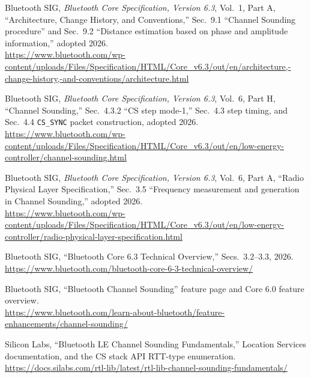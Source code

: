 \documentclass[11pt,a4paper]{article}
\newcommand{\code}[1]{\texttt{\small #1}}
\begin{document}
\begin{enumerate}[label={[\arabic*]},leftmargin=2.2em,itemsep=3pt]
\item Bluetooth SIG, \emph{Bluetooth Core Specification, Version 6.3}, Vol.\ 1, Part A,
  ``Architecture, Change History, and Conventions,'' Sec.\ 9.1 ``Channel Sounding procedure'' and
  Sec.\ 9.2 ``Distance estimation based on phase and amplitude information,'' adopted 2026.\\
  {\small\url{https://www.bluetooth.com/wp-content/uploads/Files/Specification/HTML/Core_v6.3/out/en/architecture,-change-history,-and-conventions/architecture.html}}

\item Bluetooth SIG, \emph{Bluetooth Core Specification, Version 6.3}, Vol.\ 6, Part H,
  ``Channel Sounding,'' Sec.\ 4.3.2 ``CS step mode-1,'' Sec.\ 4.3 step timing, and Sec.\ 4.4
  \code{CS\_SYNC} packet construction, adopted 2026.\\
  {\small\url{https://www.bluetooth.com/wp-content/uploads/Files/Specification/HTML/Core_v6.3/out/en/low-energy-controller/channel-sounding.html}}

\item Bluetooth SIG, \emph{Bluetooth Core Specification, Version 6.3}, Vol.\ 6, Part A,
  ``Radio Physical Layer Specification,'' Sec.\ 3.5 ``Frequency measurement and generation in
  Channel Sounding,'' adopted 2026.\\
  {\small\url{https://www.bluetooth.com/wp-content/uploads/Files/Specification/HTML/Core_v6.3/out/en/low-energy-controller/radio-physical-layer-specification.html}}

\item Bluetooth SIG, ``Bluetooth Core 6.3 Technical Overview,'' Secs.\ 3.2--3.3, 2026.\\
  {\small\url{https://www.bluetooth.com/bluetooth-core-6-3-technical-overview/}}

\item Bluetooth SIG, ``Bluetooth Channel Sounding'' feature page and Core 6.0 feature overview.\\
  {\small\url{https://www.bluetooth.com/learn-about-bluetooth/feature-enhancements/channel-sounding/}}

\item Silicon Labs, ``Bluetooth LE Channel Sounding Fundamentals,'' Location Services
  documentation, and the CS stack API RTT-type enumeration.\\
  {\small\url{https://docs.silabs.com/rtl-lib/latest/rtl-lib-channel-sounding-fundamentals/}}


\end{enumerate}
\end{document}
